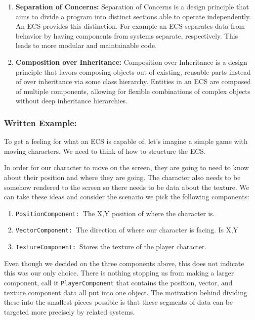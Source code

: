 \begin{enumerate}
    \item \textbf{Separation of Concerns:} Separation of Concerns is a design principle that aims to divide a program into distinct sections able to operate independently. An ECS provides this distinction. For example an ECS separates data from behavior by having components from systems separate, respectively. This leads to more modular and maintainable code.
    \item \textbf{Composition over Inheritance: }Composition over Inheritance is a design principle that favors composing objects out of existing, reusable parts instead of over inheritance via some class hierarchy. Entities in an ECS are composed of multiple components, allowing for flexible combinations of complex objects without deep inheritance hierarchies. 
\end{enumerate}

\subsubsection{Written Example:}
To get a feeling for what an ECS is capable of, let's imagine a simple game with moving characters. We need to think of how to structure the ECS. 

In order for our character to move on the screen, they are going to need to know about their position and where they are going. The character also needs to be somehow rendered to the screen so there needs to be data about the texture. We can take these ideas and consider the scenario we pick the following components:

\begin{enumerate}
    \item \texttt{PositionComponent: }The X,Y position of where the character is.
    \item \texttt{VectorComponent: }The direction of where our character is facing. Is X,Y
    \item \texttt{TextureComponent: }Stores the texture of the player character.
\end{enumerate}

Even though we decided on the three components above, this does not indicate this was our only choice. There is nothing stopping us from making a larger component, call it \texttt{PlayerComponent} that contains the position, vector, and texture component data all put into one object. The motivation behind dividing these into the smallest pieces possible is that these segments of data can be targeted more precisely by related systems. 

